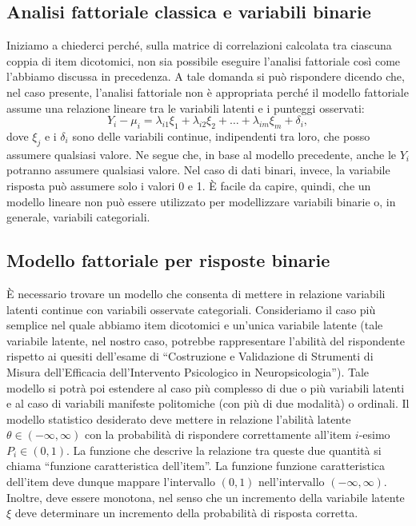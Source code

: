 \subsection{Analisi fattoriale classica e variabili binarie}

Iniziamo a chiederci perché, sulla matrice di correlazioni calcolata tra ciascuna coppia di item dicotomici, non sia possibile eseguire l'analisi fattoriale così come l'abbiamo discussa in precedenza. 
A tale domanda si può rispondere dicendo che, nel caso presente, l'analisi fattoriale non è appropriata perché il modello fattoriale assume una relazione lineare tra le variabili latenti e i punteggi osservati:
$$
Y_i - \mu_i = \lambda_{i1}\xi_1 + \lambda_{i2}\xi_2 + \dots + \lambda_{im}\xi_m + \delta_i,
$$
dove $\xi_j$ e i $\delta_i$ sono delle variabili continue, indipendenti tra loro, che posso assumere qualsiasi valore. 
Ne segue che, in base al modello precedente, anche le $Y_i$ potranno  assumere qualsiasi valore. 
Nel caso di dati binari, invece, la variabile risposta può assumere solo i valori 0 e 1. 
È facile da capire, quindi, che un modello lineare non può essere utilizzato per modellizzare variabili binarie o, in generale, variabili categoriali. 

\subsection{Modello fattoriale per risposte binarie}

È necessario trovare un modello che consenta di mettere in relazione variabili latenti continue con variabili osservate categoriali. 
Consideriamo il caso più semplice nel quale abbiamo item dicotomici e un'unica variabile latente (tale variabile latente, nel nostro caso, potrebbe rappresentare l'abilità del rispondente rispetto ai quesiti dell'esame di  ``Costruzione e Validazione di Strumenti di Misura dell'Efficacia dell'Intervento Psicologico in Neuropsicologia''). 
Tale modello si potrà poi estendere al caso più complesso di due o più variabili latenti e al caso di  variabili manifeste politomiche (con più di due modalità) o ordinali. 
Il modello statistico desiderato deve mettere in relazione l'abilità latente $\theta \in (-\infty, \infty)$ con la probabilità di rispondere correttamente all'item $i$-esimo $P_i \in (0, 1)$.  
La funzione che descrive la relazione tra queste due quantità si chiama ``funzione caratteristica dell'item''. 
La funzione funzione caratteristica dell'item deve dunque mappare l'intervallo $(0, 1)$ nell'intervallo $(-\infty, \infty)$. 
Inoltre, deve essere monotona, nel senso che un incremento della variabile latente $\xi$ deve determinare un incremento della probabilità di risposta corretta.

